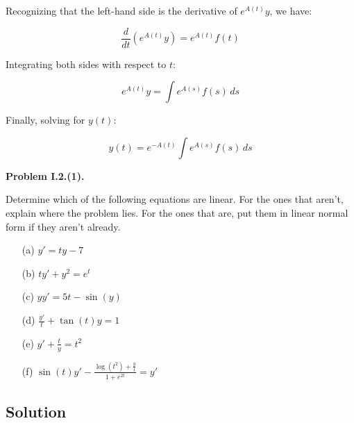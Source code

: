 \documentclass{article}
\begin{document}
Recognizing that the left-hand side is the derivative of \(e^{A(t)}y\), we have:

\[
\frac{d}{dt} \left(e^{A(t)} y \right) = e^{A(t)} f(t)
\]

Integrating both sides with respect to \(t\):

\[
e^{A(t)} y = \int e^{A(s)} f(s) \, ds
\]

Finally, solving for \(y(t)\):

\[
y(t) = e^{-A(t)} \int e^{A(s)} f(s) \, ds
\]

\textbf{Problem I.2.(1).}

Determine which of the following equations are linear. For the ones that aren't, explain where the problem lies. For the ones that are, put them in linear normal form if they aren't already.

\begin{enumerate}
    \item[(a)] \(y' = t y - 7\)
    \item[(b)] \(t y' + y^2 = e^t\)
    \item[(c)] \(y y' = 5t - \sin(y)\)
    \item[(d)] \(\frac{y'}{t} + \tan(t) y = 1\)
    \item[(e)] \(y' + \frac{t}{y} = t^2\)
    \item[(f)] \(\sin(t) y' - \frac{\log(t^2) + \frac{y}{t}}{1 + e^{2t}} = y'\)
\end{enumerate}

\subsection*{Solution}
\end{document}
